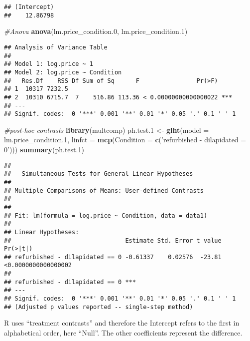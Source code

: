 \documentclass[
]{article}
\newenvironment{Shaded}{\begin{snugshade}}{\end{snugshade}}
\newcommand{\CommentTok}[1]{\textcolor[rgb]{0.56,0.35,0.01}{\textit{#1}}}
\newcommand{\DataTypeTok}[1]{\textcolor[rgb]{0.13,0.29,0.53}{#1}}
\newcommand{\FloatTok}[1]{\textcolor[rgb]{0.00,0.00,0.81}{#1}}
\newcommand{\KeywordTok}[1]{\textcolor[rgb]{0.13,0.29,0.53}{\textbf{#1}}}
\newcommand{\NormalTok}[1]{#1}
\newcommand{\StringTok}[1]{\textcolor[rgb]{0.31,0.60,0.02}{#1}}
\begin{document}
\begin{verbatim}
## (Intercept) 
##    12.86798
\end{verbatim}

\begin{Shaded}
\begin{Highlighting}[]
\CommentTok{#Anova}
\KeywordTok{anova}\NormalTok{(lm.price_condition}\FloatTok{.0}\NormalTok{, lm.price_condition}\FloatTok{.1}\NormalTok{)}
\end{Highlighting}
\end{Shaded}

\begin{verbatim}
## Analysis of Variance Table
## 
## Model 1: log.price ~ 1
## Model 2: log.price ~ Condition
##   Res.Df    RSS Df Sum of Sq      F                Pr(>F)    
## 1  10317 7232.5                                              
## 2  10310 6715.7  7    516.86 113.36 < 0.00000000000000022 ***
## ---
## Signif. codes:  0 '***' 0.001 '**' 0.01 '*' 0.05 '.' 0.1 ' ' 1
\end{verbatim}

\begin{Shaded}
\begin{Highlighting}[]
\CommentTok{#post-hoc contrasts}
\KeywordTok{library}\NormalTok{(multcomp)}
\NormalTok{ph.test}\FloatTok{.1}\NormalTok{ <-}\StringTok{ }\KeywordTok{glht}\NormalTok{(}\DataTypeTok{model =}\NormalTok{ lm.price_condition}\FloatTok{.1}\NormalTok{, }\DataTypeTok{linfct =} \KeywordTok{mcp}\NormalTok{(}\DataTypeTok{Condition =} \KeywordTok{c}\NormalTok{(}\StringTok{'refurbished - dilapidated = 0'}\NormalTok{)))}
\KeywordTok{summary}\NormalTok{(ph.test}\FloatTok{.1}\NormalTok{)}
\end{Highlighting}
\end{Shaded}

\begin{verbatim}
## 
##   Simultaneous Tests for General Linear Hypotheses
## 
## Multiple Comparisons of Means: User-defined Contrasts
## 
## 
## Fit: lm(formula = log.price ~ Condition, data = data1)
## 
## Linear Hypotheses:
##                                Estimate Std. Error t value            Pr(>|t|)
## refurbished - dilapidated == 0 -0.61337    0.02576  -23.81 <0.0000000000000002
##                                   
## refurbished - dilapidated == 0 ***
## ---
## Signif. codes:  0 '***' 0.001 '**' 0.01 '*' 0.05 '.' 0.1 ' ' 1
## (Adjusted p values reported -- single-step method)
\end{verbatim}

R uses ``treatment contrasts'' and therefore the Intercept refers to the
first in alphabetical order, here ``Null''. The other coefficients
represent the difference.
\end{document}
